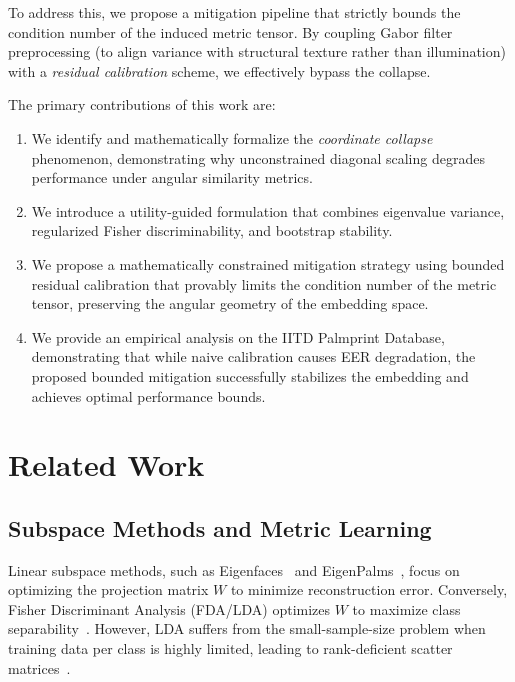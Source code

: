 \documentclass[conference]{IEEEtran}
\begin{document}
To address this, we propose a mitigation pipeline that strictly bounds the condition number of the induced metric tensor. By coupling Gabor filter preprocessing (to align variance with structural texture rather than illumination) with a \textit{residual calibration} scheme, we effectively bypass the collapse. 

The primary contributions of this work are:
\begin{enumerate}
    \item We identify and mathematically formalize the \textit{coordinate collapse} phenomenon, demonstrating why unconstrained diagonal scaling degrades performance under angular similarity metrics.
    \item We introduce a utility-guided formulation that combines eigenvalue variance, regularized Fisher discriminability, and bootstrap stability.
    \item We propose a mathematically constrained mitigation strategy using bounded residual calibration that provably limits the condition number of the metric tensor, preserving the angular geometry of the embedding space.
    \item We provide an empirical analysis on the IITD Palmprint Database, demonstrating that while naive calibration causes EER degradation, the proposed bounded mitigation successfully stabilizes the embedding and achieves optimal performance bounds.
\end{enumerate}

\section{Related Work}
\label{sec:related}

\subsection{Subspace Methods and Metric Learning}
Linear subspace methods, such as Eigenfaces~\cite{turk1991eigenfaces} and EigenPalms~\cite{lu2003palmprint}, focus on optimizing the projection matrix $W$ to minimize reconstruction error. Conversely, Fisher Discriminant Analysis (FDA/LDA) optimizes $W$ to maximize class separability~\cite{belhumeur1997eigenfaces}. However, LDA suffers from the small-sample-size problem when training data per class is highly limited, leading to rank-deficient scatter matrices~\cite{yu2001direct}. 
\end{document}
